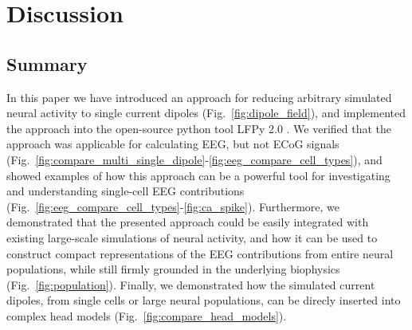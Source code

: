 \documentclass[preprint,10pt,authoryear]{elsarticle}
\newcommand{\hlg}[2][Emerald]{ {\sethlcolor{#1} \hl{#2}} }
\newcommand{\tvnnote}[1]{\color{white}{\hlg{TVN: #1 }}\color{black}}
\newcommand{\tvntxt}[1]{{\color{Emerald}#1}}
\begin{document}
\section{Discussion}\label{sec:discussion}
\tvntxt{
\subsection*{Summary}
In this paper we have introduced an approach for reducing arbitrary simulated neural activity to single current dipoles (Fig.~\ref{fig:dipole_field}), and implemented the approach into the open-source python tool LFPy 2.0 \citep{HAGEN2018}. We verified that the approach was applicable for calculating EEG, but not ECoG signals (Fig.~\ref{fig:compare_multi_single_dipole}-\ref{fig:eeg_compare_cell_types}), and showed examples of how this approach can be a powerful tool for investigating and understanding single-cell EEG contributions (Fig.~\ref{fig:eeg_compare_cell_types}-\ref{fig:ca_spike}). Furthermore, we demonstrated that the presented approach could be easily integrated with existing large-scale simulations of neural activity, and how it can be used to construct compact representations of the EEG contributions from entire neural populations, while still firmly grounded in the underlying biophysics (Fig.~\ref{fig:population}). Finally, we demonstrated how the simulated current dipoles, from single cells or large neural populations, can be direcly inserted into complex head models (Fig.~\ref{fig:compare_head_models}).
}
\end{document}
